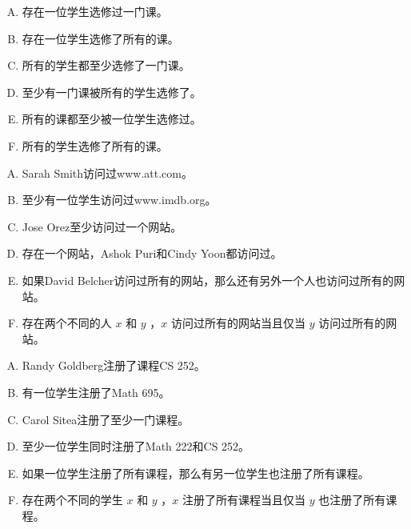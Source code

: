 {        %
        \begin{practices}
            \begin{enumerate}[A.]
                \item 存在一位学生选修过一门课。
                \item 存在一位学生选修了所有的课。
                \item 所有的学生都至少选修了一门课。
                \item 至少有一门课被所有的学生选修了。
                \item 所有的课都至少被一位学生选修过。
                \item 所有的学生选修了所有的课。
            \end{enumerate}
        \end{practices}

        \begin{practices}
            \begin{enumerate}[A.]
                \item Sarah Smith访问过www.att.com。
                \item 至少有一位学生访问过www.imdb.org。
                \item Jose Orez至少访问过一个网站。
                \item 存在一个网站，Ashok Puri和Cindy Yoon都访问过。
                \item 如果David Belcher访问过所有的网站，那么还有另外一个人也访问过所有的网站。
                \item 存在两个不同的人 $x$ 和 $y$ ，$x$ 访问过所有的网站当且仅当 $y$ 访问过所有的网站。
            \end{enumerate}
        \end{practices}

        \begin{practices}
            \begin{enumerate}[A.]
                \item Randy Goldberg注册了课程CS 252。
                \item 有一位学生注册了Math 695。
                \item Carol Sitea注册了至少一门课程。
                \item 至少一位学生同时注册了Math 222和CS 252。
                \item 如果一位学生注册了所有课程，那么有另一位学生也注册了所有课程。
                \item 存在两个不同的学生 $x$ 和 $y$ ，$x$ 注册了所有课程当且仅当 $y$ 也注册了所有课程。
            \end{enumerate}
        \end{practices}

}
